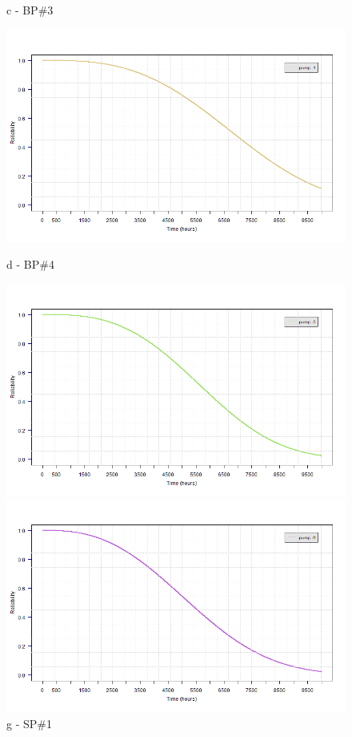 \begin{figure}[!htb]
\begin{minipage}[b]{0.5\linewidth}
		\caption*{c - BP\#3}
	\end{minipage}
	\hspace{0.05cm}
	\begin{minipage}[b]{0.5\linewidth}
		\centering
		\includegraphics[width=\textwidth]{figures/ch05_fig_sur_pump4}
		\caption*{d - BP\#4}
	\end{minipage}
	\hspace{0.05cm}
	\begin{minipage}[b]{0.5\linewidth}
		\centering
		\includegraphics[width=\textwidth]{figures/ch05_fig_sur_pump5}
		\caption*{g -  SP\#1}
	\end{minipage}
	\hspace{0.05cm}
	\begin{minipage}[b]{0.5\linewidth}
		\centering
		\includegraphics[width=\textwidth]{figures/ch05_fig_sur_pump6}

\end{minipage}
\end{figure}
